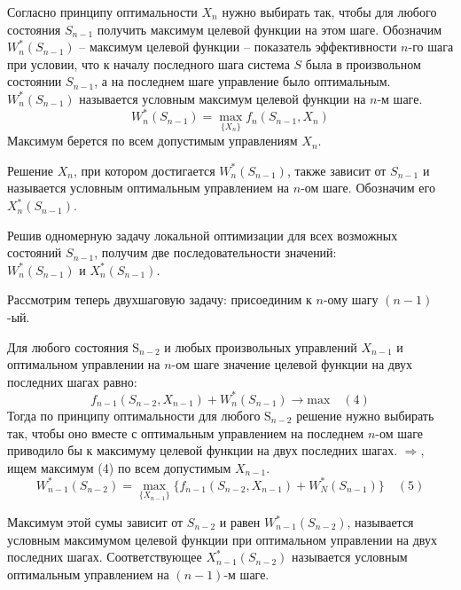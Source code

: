 \documentclass[17pt]{extarticle}
\begin{document}
Согласно принципу оптимальности \( X_n \) нужно выбирать так,
чтобы для любого состояния \( S_{n-1} \) получить максимум целевой функции на этом шаге.
Обозначим $W_n^*(S_{n-1})$ -- максимум целевой функции -- показатель эффективности $n$-го шага при условии,
что к началу последного шага система $S$ была в произвольном состоянии $S_{n-1}$,
а на последнем шаге управление было оптимальным.
$W_n^*(S_{n-1})$ называется условным максимум целевой функции на $n$-м шаге.
\[W_n^*(S_{n-1})=\max_{\{X_n\}}f_n(S_{n-1}, X_n)\]
Максимум берется по всем допустимым управлениям \( X_n \).

Решение \( X_n \), при котором достигается \( W_n^*(S_{n-1}) \),
также зависит от \( S_{n-1} \) и называется условным оптимальным управлением на \( n \)-ом шаге.
Обозначим его \( X_n^*(S_{n-1}) \).

Решив одномерную задачу локальной оптимизации для всех возможных состояний \( S_{n-1} \),
получим две последовательности значений:\\ \( W_n^*(S_{n-1}) \) и \( X_n^*(S_{n-1}) \).

Рассмотрим теперь двухшаговую задачу: присоединим к \( n \)-ому шагу \( (n-1) \)-ый.

Для любого состояния \( \text{S}_{n-2} \) и любых произвольных управлений \( X_{n-1} \)
и оптимальном управлении на \( n \)-ом шаге значение целевой функции на двух последних шагах равно:
\[
    f_{n-1}(S_{n-2}, X_{n-1}) + W_n^*(S_{n-1}) \rightarrow \text{max} \quad (4)
\]
Тогда по принципу оптимальности для любого \( \text{S}_{n-2} \) решение нужно выбирать так,
чтобы оно вместе с оптимальным управлением на последнем \( n \)-ом шаге приводило бы к максимуму целевой функции на двух последних шагах.
$\Rightarrow$, ищем максимум (4) по всем допустимым $X_{n-1}$.
\[
    W_{n-1}^*(S_{n-2})=\max_{\{X_{n-1}\}}\{f_{n-1}(S_{n-2}, X_{n-1}) + W_N^*(S_{n-1})\} \quad (5)
\]

Максимум этой сумы зависит от $S_{n-2}$ и равен $W_{n-1}^*(S_{n-2})$,
называется \\ условным максимумом целевой функции при оптимальном управлении на двух последних шагах.
Соответствующее $X_{n-1}^*(S_{n-2})$ называется условным оптимальным управлением на $(n-1)$-м шаге.
\end{document}
